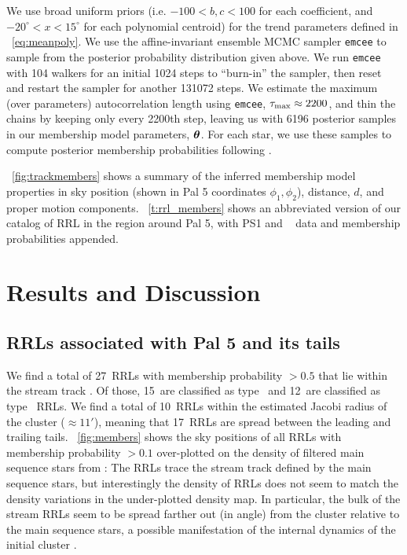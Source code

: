 \documentclass[twocolumn]{aastex63}
\newcommand{\NRRL}{27}     %
\newcommand{\NRRab}{15}    %
\newcommand{\NRRc}{12}     %
\newcommand{\NRRcl}{10}     %
\newcommand{\NRRtails}{17} %
\begin{document}
We use broad uniform priors (i.e. $-100 < b, c < 100$ for each coefficient, and $-20^\circ < x < 15^\circ$ for each polynomial centroid) for the trend parameters defined in \equationname~\ref{eq:meanpoly}.
We use the affine-invariant ensemble MCMC sampler \texttt{emcee} \citep{emcee} to sample from the posterior probability distribution given above.
We run \texttt{emcee} with 104 walkers for an initial 1024 steps to ``burn-in'' the sampler, then reset and restart the sampler for another 131072 steps.
We estimate the maximum (over parameters) autocorrelation length using \texttt{emcee}, $\tau_{\rm max} \approx 2200$, and thin the chains by keeping only every 2200th step, leaving us with 6196 posterior samples in our membership model parameters, $\boldsymbol{\theta}$.
For each star, we use these samples to compute posterior membership probabilities following \citet{DFM:blog}.

\figurename~\ref{fig:trackmembers} shows a summary of the inferred membership model properties in sky position (shown in Pal 5 coordinates $\phi_1, \phi_2$), distance, $d$, and proper motion components.
\tablename~\ref{t:rrl_members} shows an abbreviated version of our catalog of RRL in the region around Pal 5, with PS1 and \Gaia~ data and membership probabilities appended.

\section{Results and Discussion} \label{sec:results}

\subsection{RRLs associated with Pal 5 and its tails}
We find a total of \NRRL\ RRLs with membership probability $> 0.5$ that lie within the stream track \citep[again using the track from][see lines in Figure~\ref{fig:members}]{Bonaca:2019}.
Of those, \NRRab\ are classified as type \typeab\ and \NRRc\ are classified as type \typec\ RRLs.
We find a total of \NRRcl\ RRLs within the estimated Jacobi radius of the cluster ($\approx 11'$), meaning that \NRRtails\ RRLs are spread between the leading and trailing tails.
\figurename~\ref{fig:members} shows the sky positions of all RRLs with membership probability $>0.1$ over-plotted on the density of filtered main sequence stars from \citet{Bonaca:2019}:
The RRLs trace the stream track defined by the main sequence stars, but interestingly the density of RRLs does not seem to match the density variations in the under-plotted density map.
In particular, the bulk of the stream RRLs seem to be spread farther out (in angle) from the cluster relative to the main sequence stars, a possible manifestation of the internal dynamics of the initial cluster \citep[e.g., mass segregation][]{Koch:2004}.
\end{document}
